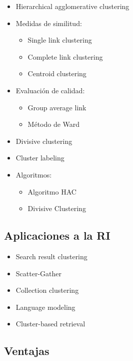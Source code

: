 \documentclass{llncs}
\begin{document}
\begin{itemize}
\item Hierarchical agglomerative clustering

\item Medidas de similitud:
\begin{itemize}
	\item Single link clustering
	\item Complete link clustering
	\item Centroid clustering
\end{itemize}

\item Evaluaci\'on de calidad:
\begin{itemize}
\item Group average link
\item M\'etodo de Ward
\end{itemize}

\item Divisive clustering

\item Cluster labeling

\item Algoritmos:
\begin{itemize}
	\item Algoritmo HAC
	\item Divisive Clustering
\end{itemize}
\end{itemize}

\subsection{Aplicaciones a la RI} 
\begin{itemize}
	\item Search result clustering
	
	\item Scatter-Gather
	
	\item Collection clustering
	
	\item Language modeling
	
	\item Cluster-based retrieval
\end{itemize}

\subsection{Ventajas} 
\end{document}
